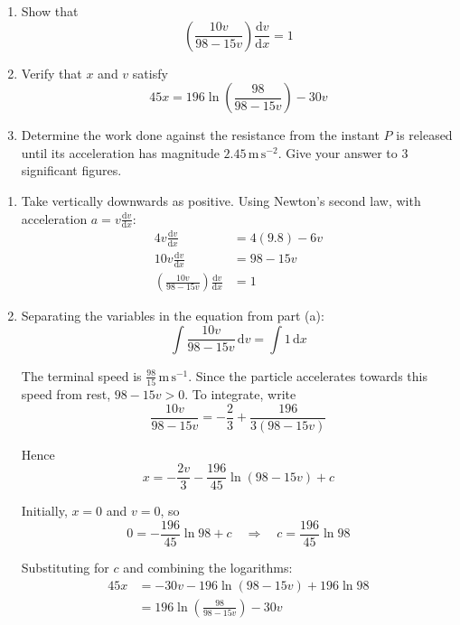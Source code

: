 \documentclass[leqno]{article}
\begin{document}
\begin{enumerate}[
  label=\textbf{\arabic*.},
  leftmargin=*,
  topsep=0pt,
  partopsep=0pt,
  parsep=0pt
]
\begin{enumerate}[label=\textbf{(\alph*)}]
  \item Show that
  \[
  \left(\frac{10v}{98-15v}\right)\frac{\mathrm{d}v}{\mathrm{d}x}=1
  \]
  \item Verify that $x$ and $v$ satisfy
  \[
  45x=196\ln\left(\frac{98}{98-15v}\right)-30v
  \]
  \item Determine the work done against the resistance from the instant $P$ is released until its acceleration has magnitude $2.45\,\mathrm{m\,s^{-2}}$. Give your answer to $3$ significant figures.  \\
\end{enumerate}

\vspace*{10pt}

\begin{djsSolution}
\begin{enumerate}[label=\textbf{(\alph*)}, start=1]
\item Take vertically downwards as positive. Using Newton's second law, with acceleration \(a=v\frac{\mathrm{d}v}{\mathrm{d}x}\):
\begin{align*}
4v\frac{\mathrm{d}v}{\mathrm{d}x}&=4(9.8)-6v\\
10v\frac{\mathrm{d}v}{\mathrm{d}x}&=98-15v\\
\left(\frac{10v}{98-15v}\right)\frac{\mathrm{d}v}{\mathrm{d}x}&=1
\end{align*}

\item Separating the variables in the equation from part (a):
\[
\int\frac{10v}{98-15v}\,\mathrm{d}v=\int 1\,\mathrm{d}x
\]

The terminal speed is \(\frac{98}{15}\,\mathrm{m\,s^{-1}}\). Since the particle accelerates towards this speed from rest, \(98-15v>0\). To integrate, write
\[
\frac{10v}{98-15v}=-\frac23+\frac{196}{3(98-15v)}
\]

Hence
\[
x=-\frac{2v}{3}-\frac{196}{45}\ln(98-15v)+c
\]

Initially, \(x=0\) and \(v=0\), so
\[
0=-\frac{196}{45}\ln98+c
\quad\Longrightarrow\quad
c=\frac{196}{45}\ln98
\]

Substituting for \(c\) and combining the logarithms:
\begin{align*}
45x&=-30v-196\ln(98-15v)+196\ln98\\
&=196\ln\left(\frac{98}{98-15v}\right)-30v
\end{align*}


\end{enumerate}
\end{djsSolution}
\end{enumerate}
\end{document}
